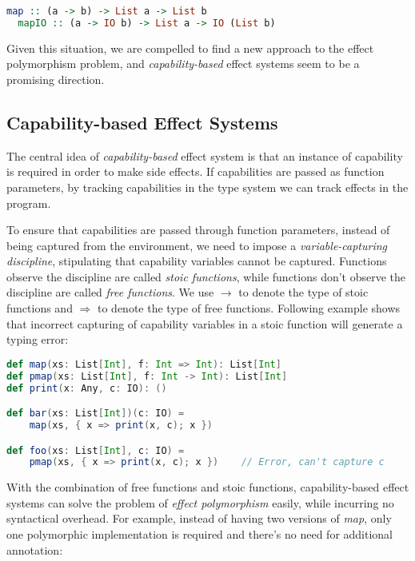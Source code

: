 \begin{lstlisting}[language=Haskell]
  map :: (a -> b) -> List a -> List b
  mapIO :: (a -> IO b) -> List a -> IO (List b)
\end{lstlisting}

Given this situation, we are compelled to find a new approach to the
effect polymorphism problem, and \emph{capability-based} effect
systems seem to be a promising direction.

\subsection{Capability-based Effect Systems}

The central idea of \emph{capability-based} effect system is that an
instance of capability is required in order to make side effects. If
capabilities are passed as function parameters, by tracking
capabilities in the type system we can track effects in the program.

To ensure that capabilities are passed through function parameters,
instead of being captured from the environment, we need to impose a
\emph{variable-capturing discipline}, stipulating that capability
variables cannot be captured. Functions observe the discipline are
called \emph{stoic functions}, while functions don't observe the
discipline are called \emph{free functions}. We use $\to$ to denote
the type of stoic functions and $\Rightarrow$ to denote the type of
free functions. Following example shows that incorrect capturing of
capability variables in a stoic function will generate a typing error:

\begin{lstlisting}[language=Scala]
def map(xs: List[Int], f: Int => Int): List[Int]
def pmap(xs: List[Int], f: Int -> Int): List[Int]
def print(x: Any, c: IO): ()

def bar(xs: List[Int])(c: IO) =
    map(xs, { x => print(x, c); x })

def foo(xs: List[Int], c: IO) =
    pmap(xs, { x => print(x, c); x })    // Error, can't capture c
\end{lstlisting}

With the combination of free functions and stoic functions,
capability-based effect systems can solve the problem of \emph{effect
  polymorphism} easily, while incurring no syntactical overhead. For
example, instead of having two versions of \emph{map}, only one
polymorphic implementation is required and there's no need for
additional annotation:

